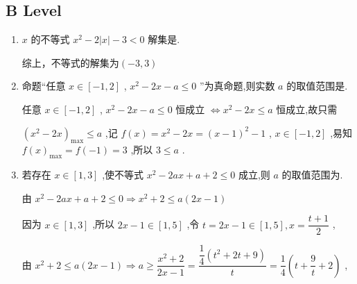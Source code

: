 \subsection*{B Level}
\begin{enumerate}
    
    \item  $x$ 的不等式 ${x}^{2} - 2\left| x\right|  - 3 < 0$ 解集是.
    \begin{jieda}
        综上，不等式的解集为$(-3,3)$
    \end{jieda}
    
    \item 命题“任意 $x \in  \left\lbrack  {-1,2}\right\rbrack$ , ${x}^{2} - {2x} - a \leq  0$ ”为真命题,则实数 $a$ 的取值范围是.
    \begin{jieda}
        任意 $x \in  \left\lbrack  {-1,2}\right\rbrack$ , ${x}^{2} - {2x} - a \leq  0$ 恒成立 $\Longleftrightarrow  {x}^{2} - {2x} \leq  a$ 恒成立,故只需
        
        ${\left( {x}^{2} - 2x\right) }_{\max } \leq  a$ ,记 $f\left( x\right)  = {x}^{2} - {2x} = {\left( x - 1\right) }^{2} - 1$ , $x \in  \left\lbrack  {-1,2}\right\rbrack$ ,易知 $f{\left( x\right) }_{\max } = f\left( {-1}\right)  = 3$ ,所以 $3 \leq  a$ .
    \end{jieda}
    \item 若存在 $x \in  \left\lbrack  {1,3}\right\rbrack$ ,使不等式 ${x}^{2} - {2ax} + a + 2 \leq  0$ 成立,则 $a$ 的取值范围为.
    \begin{jieda}
        由 ${x}^{2} - {2ax} + a + 2 \leq  0 \Longrightarrow  {x}^{2} + 2 \leq  a\left( {{2x} - 1}\right)$

        因为 $x \in  \left\lbrack  {1,3}\right\rbrack$ ,所以 ${2x} - 1 \in  \left\lbrack  {1,5}\right\rbrack$ ,令 $t = {2x} - 1 \in  \left\lbrack  {1,5}\right\rbrack  ,x = \dfrac{t + 1}{2}$ ,
        
        由 ${x}^{2} + 2 \leq  a\left( {{2x} - 1}\right)  \Longrightarrow  a \geq  \dfrac{{x}^{2} + 2}{{2x} - 1} = \dfrac{\dfrac{1}{4}\left( {{t}^{2} + {2t} + 9}\right) }{t} = \dfrac{1}{4}\left( {t + \dfrac{9}{t} + 2}\right)$ ,
        

\end{jieda}
\end{enumerate}
